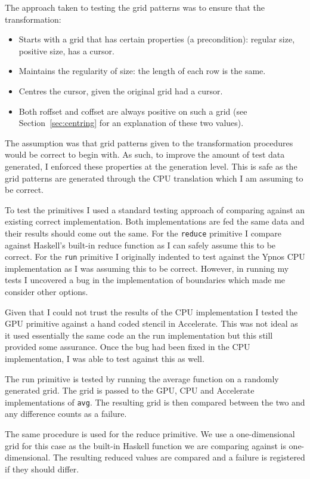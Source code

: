 \documentclass[12pt,a4paper,oneside]{scrbook}
\begin{document}
The approach taken to testing the grid patterns was to ensure that the
transformation:

\begin{itemize}
\item
  Starts with a grid that has certain properties (a precondition):
  regular size, positive size, has a cursor.
\item
  Maintains the regularity of size: the length of each row is the same.
\item
  Centres the cursor, given the original grid had a cursor.
\item
  Both roffset and coffset are always positive on such a grid (see
  Section~\ref{sec:centring} for an explanation of these two values).
\end{itemize}

The assumption was that grid patterns given to the transformation procedures
would be correct to begin with. As such, to improve the amount of test data
generated, I enforced these properties at the generation level. This is safe as
the grid patterns are generated through the CPU translation which I am assuming
to be correct.

To test the primitives I used a standard testing approach of comparing against
an existing correct implementation. Both implementations are fed the same data
and their results should come out the same. For the \texttt{reduce} primitive I
compare against Haskell's built-in reduce function as I can safely assume this
to be correct. For the \texttt{run} primitive I originally indented to test
against the Ypnos CPU implementation as I was assuming this to be
correct. However, in running my tests I uncovered a bug in the implementation of
boundaries which made me consider other options.

Given that I could not trust the results of the CPU implementation I tested the
GPU primitive against a hand coded stencil in Accelerate.  This was not ideal as
it used essentially the same code an the run implementation but this still
provided some assurance. Once the bug had been fixed in the CPU implementation,
I was able to test against this as well.

The run primitive is tested by running the average function on a randomly
generated grid. The grid is passed to the GPU, CPU and Accelerate
implementations of \texttt{avg}. The resulting grid is then compared between the
two and any difference counts as a failure.

The same procedure is used for the reduce primitive. We use a one-dimensional
grid for this case as the built-in Haskell function we are comparing against is
one-dimensional. The resulting reduced values are compared and a failure is
registered if they should differ.
\end{document}
